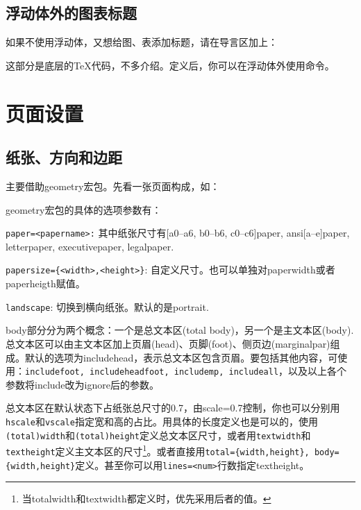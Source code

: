 {\subsection{浮动体外的图表标题}
如果不使用浮动体，又想给图、表添加标题，请在导言区加上：
\begin{latex}{}
\makeatletter
\newcommand\figcaption{\def\@captype{figure}\caption}
\newcommand\tabcaption{\def\@captype{table}\caption}
\makeatother
\end{latex}

这部分是底层的\TeX 代码，不多介绍。定义后，你可以在浮动体外使用命令。

\section{页面设置}

\subsection{纸张、方向和边距}
主要借助geometry宏包。先看一张页面构成，如：
\begin{figure}
\centering
\label{fig:geo-paper}

\end{figure}

geometry宏包的具体的选项参数有：
\begin{feai}
\item \texttt{paper=<papername>:} 其中纸张尺寸有[a0--a6, b0--b6, c0--c6]paper, ansi[a--e]paper, letterpaper, executivepaper, legalpaper. 
\item \texttt{papersize=\{<width>,<height>\}}: 自定义尺寸。也可以单独对paperwidth或者paperheigth赋值。
\item \texttt{landscape}: 切换到横向纸张。默认的是portrait. 
\end{feai}

body部分分为两个概念：一个是总文本区(total body)，另一个是主文本区(body). 总文本区可以由主文本区加上页眉(head)、页脚(foot)、侧页边(marginalpar)组成。默认的选项为includehead，表示总文本区包含页眉。要包括其他内容，可使用：\texttt{includefoot, includeheadfoot, includemp, includeall}，以及以上各个参数将include改为ignore后的参数。

总文本区在默认状态下占纸张总尺寸的0.7，由scale=0.7控制，你也可以分别用\texttt{hscale}和\texttt{vscale}指定宽和高的占比。用具体的长度定义也是可以的，使用\texttt{(total)width}和\texttt{(total)height}定义总文本区尺寸，或者用\texttt{textwidth}和\texttt{textheight}定义主文本区的尺寸\footnote{当totalwidth和textwidth都定义时，优先采用后者的值。}。或者直接用\texttt{total=\{width,height\}, body=\{width,height\}}定义。甚至你可以用\texttt{lines=<num>}行数指定textheight。

}
